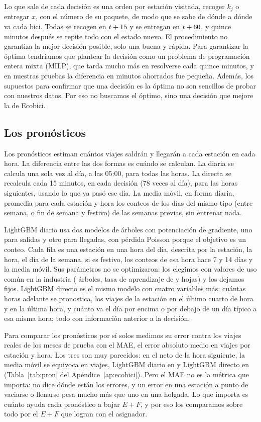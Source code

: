 \documentclass[conference,letterpaper,10pt]{IEEEtran}
\newcommand{\EF}{E+F}
\begin{document}
Lo que sale de cada decisión es una orden por estación visitada, recoger $k_j$ o entregar $x$, con el número de su paquete, de modo que se sabe de dónde a dónde va cada bici. Todas se recogen en $t+15$ y se entregan en $t+60$, y quince minutos después se repite todo con el estado nuevo. El procedimiento no garantiza la mejor decisión posible, solo una buena y rápida. Para garantizar la óptima tendríamos que plantear la decisión como un problema de programación entera mixta (MILP), que tarda mucho más en resolverse cada quince minutos, y en nuestras pruebas la diferencia en minutos ahorrados fue pequeña. Además, los supuestos para confirmar que una decisión es la óptima no son sencillos de probar con nuestros datos. Por eso no buscamos el óptimo, sino una decisión que mejore la de Ecobici.

\subsection{Los pronósticos}
Los pronósticos estiman cuántos viajes saldrán y llegarán a cada estación en cada hora. La diferencia entre las dos formas es cuándo se calculan. La diaria se calcula una sola vez al día, a las 05:00, para todas las horas. La directa se recalcula cada 15 minutos, en cada decisión (78 veces al día), para las \rnDiario{} horas siguientes, usando lo que ya pasó ese día. La media móvil, en forma diaria, promedia para cada estación y hora los conteos de los días del mismo tipo (entre semana, o fin de semana y festivo) de las \rsemanasHist{} semanas previas, sin entrenar nada.

LightGBM diario usa dos modelos de árboles con potenciación de gradiente, uno para salidas y otro para llegadas, con pérdida Poisson porque el objetivo es un conteo. Cada fila es una estación en una hora del día, descrita por la estación, la hora, el día de la semana, si es festivo, los conteos de esa hora hace 7 y 14 días y la media móvil. Sus parámetros no se optimizaron: los elegimos con valores de uso común en la industria (\rlgbArboles{} árboles, tasa de aprendizaje de \rlgbTasa{} y \rlgbHojas{} hojas) y los dejamos fijos. LightGBM directo es el mismo modelo con cuatro variables más: cuántas horas adelante se pronostica, los viajes de la estación en el último cuarto de hora y en la última hora, y cuánto va el día por encima o por debajo de un día típico a esa misma hora; todo con información anterior a la decisión.

Para comparar los pronósticos por sí solos medimos su error contra los viajes reales de los \cfMeses{} meses de prueba con el MAE, el error absoluto medio en viajes por estación y hora. Los tres son muy parecidos: en el neto de la hora siguiente, la media móvil se equivoca en \cfMaeNetoMa{} viajes, LightGBM diario en \cfMaeNetoD{} y LightGBM directo en \cfMaeNetoDir{} (Tabla~\ref{tab:pron} del Apéndice~\ref{ap:ecobici}). Pero el MAE no es la métrica que importa: no dice dónde están los errores, y un error en una estación a punto de vaciarse o llenarse pesa mucho más que uno en una holgada. Lo que importa es cuánto ayuda cada pronóstico a bajar $\EF$, y por eso los comparamos sobre todo por el $\EF$ que logran con el asignador.
\end{document}
